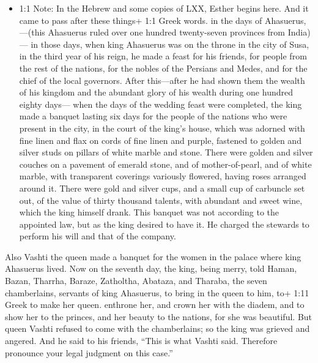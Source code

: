 \begin{itemize}
\tightlist
\item
  1:1 Note: In the Hebrew and some copies of LXX, Esther begins here.
  And it came to pass after these things+ 1:1 Greek words. in the days
  of Ahasuerus, ---(this Ahasuerus ruled over one hundred twenty-seven
  provinces from India)---  in those days, when king
  Ahasuerus was on the throne in the city of Susa,  in the
  third year of his reign, he made a feast for his friends, for people
  from the rest of the nations, for the nobles of the Persians and
  Medes, and for the chief of the local governors.  After
  this---after he had shown them the wealth of his kingdom and the
  abundant glory of his wealth during one hundred eighty days---
   when the days of the wedding feast were completed, the
  king made a banquet lasting six days for the people of the nations who
  were present in the city, in the court of the king's house,
   which was adorned with fine linen and flax on cords of
  fine linen and purple, fastened to golden and silver studs on pillars
  of white marble and stone. There were golden and silver couches on a
  pavement of emerald stone, and of mother-of-pearl, and of white
  marble, with transparent coverings variously flowered, having roses
  arranged around it.  There were gold and silver cups, and
  a small cup of carbuncle set out, of the value of thirty thousand
  talents, with abundant and sweet wine, which the king himself drank.
   This banquet was not according to the appointed law, but
  as the king desired to have it. He charged the stewards to perform his
  will and that of the company.
\end{itemize}

 Also Vashti the queen made a banquet for the women in the
palace where king Ahasuerus lived.  Now on the seventh day,
the king, being merry, told Haman, Bazan, Tharrha, Baraze, Zatholtha,
Abataza, and Tharaba, the seven chamberlains, servants of king
Ahasuerus,  to bring in the queen to him, to+ 1:11 Greek to
make her queen. enthrone her, and crown her with the diadem, and to show
her to the princes, and her beauty to the nations, for she was
beautiful.  But queen Vashti refused to come with the
chamberlains; so the king was grieved and angered.  And he
said to his friends, ``This is what Vashti said. Therefore pronounce
your legal judgment on this case.''

